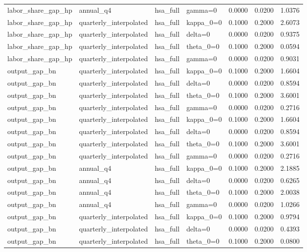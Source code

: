 \begin{tabular}{llllrrr}
labor\_share\_gap\_hp & annual\_q4 & hsa\_full & gamma=0 & 0.0000 & 0.0200 & 1.0376 \\
labor\_share\_gap\_hp & quarterly\_interpolated & hsa\_full & kappa\_0=0 & 0.1000 & 0.2000 & 2.6073 \\
labor\_share\_gap\_hp & quarterly\_interpolated & hsa\_full & delta=0 & 0.0000 & 0.0200 & 0.9375 \\
labor\_share\_gap\_hp & quarterly\_interpolated & hsa\_full & theta\_0=0 & 0.1000 & 0.2000 & 0.0594 \\
labor\_share\_gap\_hp & quarterly\_interpolated & hsa\_full & gamma=0 & 0.0000 & 0.0200 & 0.9031 \\
output\_gap\_bn & quarterly\_interpolated & hsa\_full & kappa\_0=0 & 0.1000 & 0.2000 & 1.6604 \\
output\_gap\_bn & quarterly\_interpolated & hsa\_full & delta=0 & 0.0000 & 0.0200 & 0.8594 \\
output\_gap\_bn & quarterly\_interpolated & hsa\_full & theta\_0=0 & 0.1000 & 0.2000 & 3.6001 \\
output\_gap\_bn & quarterly\_interpolated & hsa\_full & gamma=0 & 0.0000 & 0.0200 & 0.2716 \\
output\_gap\_bn & quarterly\_interpolated & hsa\_full & kappa\_0=0 & 0.1000 & 0.2000 & 1.6604 \\
output\_gap\_bn & quarterly\_interpolated & hsa\_full & delta=0 & 0.0000 & 0.0200 & 0.8594 \\
output\_gap\_bn & quarterly\_interpolated & hsa\_full & theta\_0=0 & 0.1000 & 0.2000 & 3.6001 \\
output\_gap\_bn & quarterly\_interpolated & hsa\_full & gamma=0 & 0.0000 & 0.0200 & 0.2716 \\
output\_gap\_bn & annual\_q4 & hsa\_full & kappa\_0=0 & 0.1000 & 0.2000 & 2.1885 \\
output\_gap\_bn & annual\_q4 & hsa\_full & delta=0 & 0.0000 & 0.0200 & 0.6265 \\
output\_gap\_bn & annual\_q4 & hsa\_full & theta\_0=0 & 0.1000 & 0.2000 & 2.0038 \\
output\_gap\_bn & annual\_q4 & hsa\_full & gamma=0 & 0.0000 & 0.0200 & 1.0266 \\
output\_gap\_bn & quarterly\_interpolated & hsa\_full & kappa\_0=0 & 0.1000 & 0.2000 & 0.9794 \\
output\_gap\_bn & quarterly\_interpolated & hsa\_full & delta=0 & 0.0000 & 0.0200 & 0.4393 \\
output\_gap\_bn & quarterly\_interpolated & hsa\_full & theta\_0=0 & 0.1000 & 0.2000 & 0.0800 \\

\end{tabular}

